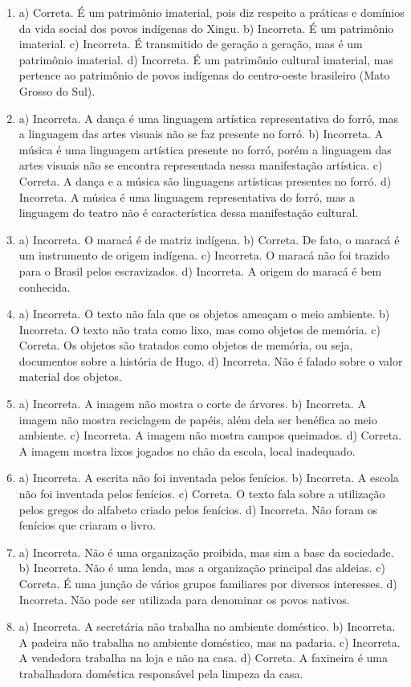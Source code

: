 \begin{enumerate}
\item
a) Correta. É um patrimônio imaterial, pois diz respeito a práticas e
domínios da vida social dos povos indígenas do Xingu.
b) Incorreta. É um patrimônio imaterial.
c) Incorreta. É transmitido de geração a geração, mas é um patrimônio
imaterial.
d) Incorreta. É um patrimônio cultural imaterial, mas pertence ao
patrimônio de povos indígenas do centro-oeste brasileiro (Mato Grosso do
Sul).

\item
a) Incorreta. A dança é uma linguagem artística representativa do forró,
mas a linguagem das artes visuais não se faz presente no forró.
b) Incorreta. A música é uma linguagem artística presente no forró,
porém a linguagem das artes visuais não se encontra representada nessa
manifestação artística.
c) Correta. A dança e a música são linguagens artísticas presentes no
forró.
d) Incorreta. A música é uma linguagem representativa do forró, mas a
linguagem do teatro não é característica dessa manifestação cultural.

\item
a) Incorreta. O maracá é de matriz indígena.
b) Correta. De fato, o maracá é um instrumento de origem indígena.
c) Incorreta. O maracá não foi trazido para o Brasil pelos escravizados.
d) Incorreta. A origem do maracá é bem conhecida.

\item
a) Incorreta. O texto não fala que os objetos ameaçam o meio ambiente.
b) Incorreta. O texto não trata como lixo, mas como objetos de memória.
c) Correta. Os objetos são tratados como objetos de memória, ou seja,
documentos sobre a história de Hugo.
d) Incorreta. Não é falado sobre o valor material dos objetos.

\item
a) Incorreta. A imagem não mostra o corte de árvores.
b) Incorreta. A imagem não mostra reciclagem de papéis, além dela ser
benéfica ao meio ambiente.
c) Incorreta. A imagem não mostra campos queimados.
d) Correta. A imagem mostra lixos jogados no chão da escola, local
inadequado.

\item
a) Incorreta. A escrita não foi inventada pelos fenícios.
b) Incorreta. A escola não foi inventada pelos fenícios.
c) Correta. O texto fala sobre a utilização pelos gregos do alfabeto
criado pelos fenícios.
d) Incorreta. Não foram os fenícios que criaram o livro.

\item
a) Incorreta. Não é uma organização proibida, mas sim a base da
sociedade.
b) Incorreta. Não é uma lenda, mas a organização principal das aldeias.
c) Correta. É uma junção de vários grupos familiares por diversos
interesses.
d) Incorreta. Não pode ser utilizada para denominar os povos nativos.

\item
a) Incorreta. A secretária não trabalha no ambiente doméstico.
b) Incorreta. A padeira não trabalha no ambiente doméstico, mas na
padaria.
c) Incorreta. A vendedora trabalha na loja e não na casa.
d) Correta. A faxineira é uma trabalhadora doméstica responsável pela
limpeza da casa.
\end{enumerate}

